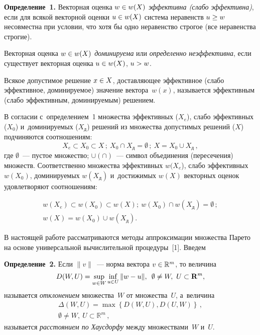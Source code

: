 \begin{multicols}{2}
\smallskip

\noindent
  \textbf{Определение~1.} Векторная оценка $w\hm\in w(X)$ 
\textit{эффективна (слабо эффективна)}, если для всякой векторной оценки 
$u\hm\in w(X)$ сис\-те\-ма неравенств $u\hm\geq w$ несовместна при 
условии, что хотя бы одно неравенство строгое (все неравенства строгие).
  
  Векторная оценка $w\hm\in w(X)$ \textit{доминируема} или 
\textit{определенно неэффективна}, если существует векторная оценка 
$u\hm\in w(X)$, $u\hm> w$.
  
  Всякое допустимое решение $x\hm\in X$, доставляющее эффективное 
(слабо эффективное, доминируемое) значение вектора~$w(x)$, называется 
эффективным (слабо эффективным, доминируемым) \mbox{решением}.
  
  В согласии с~определением~1 множества эффективных 
($X_{e}$), слабо эффективных ($X_0$) и~доминируемых 
($X_{\mathrm{д}}$) решений из множества допустимых решений ($X$) 
подчиняются соотношениям:
  $$
  X_{e}\subset X_0\subset X\,;\ X_0\cap 
X_{\mathrm{д}}=\emptyset\,;\ X=X_0\cup X_{\mathrm{д}}\,,
  $$
где $\emptyset$~--- пустое множество; $\cup (\cap)$~--- символ объединения 
(пересечения) множеств. Соответственно множества 
  эффективных $w(X_{e}$), слабо 
эффективных $w(X_0)$, доминируемых $w(X_{\mathrm{д}})$ и~достижимых  $w(X)$ векторных оценок 
удовлетворяют соотношениям:

\noindent
\begin{multline*}
 w(X_{e}) \subset  w(X_{0}) \subset w(X);\
w(X_0)\cap  w(X_{\mathrm{д}})=\emptyset\,;\\
w(X)=w(X_0)\cup w (X_{\mathrm{д}}).
\end{multline*}
  
  В настоящей работе рассматриваются методы аппроксимации множества 
Парето на основе универсальной вычислительной процедуры~[1]. Введем
  
\pagebreak
  
  \noindent
  \textbf{Определение~2.} Если $\| v\|$~--- норма вектора $v\hm\in 
\mathbb{R}^m$, то величина
  $$
  D(W,U)=\sup\limits_{w\in W} \mathop{\mathrm{inf}}\limits_{u\in U} \| w-
u\|,\enskip \emptyset \not= W,\ U\subset \mathbf{R}^m,
  $$
называется \textit{отклонением} множества~$W$ от множества~$U$, 
а~величина
\begin{multline*}
\Delta (W,U) =\max\left\{ D(W,U), D(U,W)\right\}\,,\\
 \emptyset\not= W,\ U\subset \mathbb{R}^m\,,
\end{multline*}
называется \textit{расстоянием по Хаусдорфу} между множествами~$W$ и~$U$.


\end{multicols}
